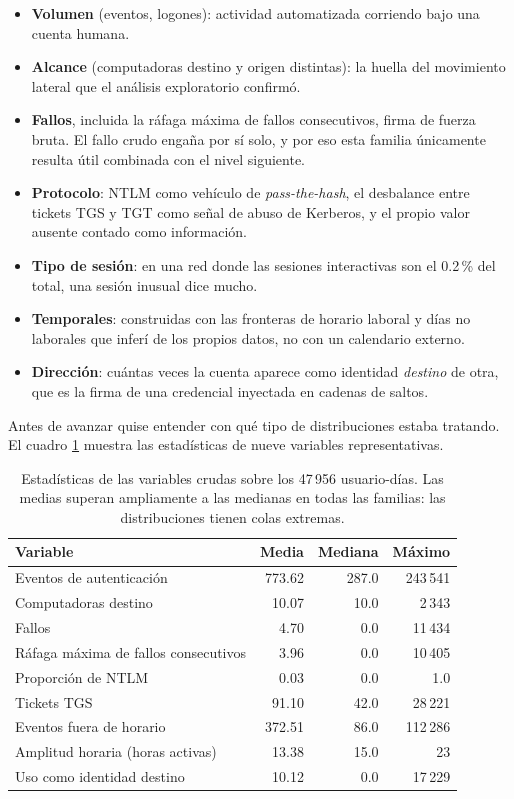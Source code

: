 \documentclass[12pt, a4paper]{article}
\begin{document}
\begin{itemize}[leftmargin=1.2cm, itemsep=2pt]
  \item \textbf{Volumen} (eventos, logones): actividad automatizada corriendo bajo una cuenta humana.
  \item \textbf{Alcance} (computadoras destino y origen distintas): la huella del movimiento lateral
        que el análisis exploratorio confirmó.
  \item \textbf{Fallos}, incluida la ráfaga máxima de fallos consecutivos, firma de fuerza bruta. El
        fallo crudo engaña por sí solo, y por eso esta familia únicamente resulta útil combinada con
        el nivel siguiente.
  \item \textbf{Protocolo}: NTLM como vehículo de \textit{pass-the-hash}, el desbalance entre tickets
        TGS y TGT como señal de abuso de Kerberos, y el propio valor ausente contado como información.
  \item \textbf{Tipo de sesión}: en una red donde las sesiones interactivas son el 0.2\,\% del total,
        una sesión inusual dice mucho.
  \item \textbf{Temporales}: construidas con las fronteras de horario laboral y días no laborales que
        inferí de los propios datos, no con un calendario externo.
  \item \textbf{Dirección}: cuántas veces la cuenta aparece como identidad \textit{destino} de otra,
        que es la firma de una credencial inyectada en cadenas de saltos.
\end{itemize}

Antes de avanzar quise entender con qué tipo de distribuciones estaba tratando. El cuadro
\ref{tab:crudas} muestra las estadísticas de nueve variables representativas.

\begin{table}[!htb]
\centering
\small
\setlength{\tabcolsep}{8pt}
\begin{tabular}{lrrr}
\toprule
\textbf{Variable} & \textbf{Media} & \textbf{Mediana} & \textbf{Máximo} \\
\midrule
Eventos de autenticación & 773.62 & 287.0 & 243\,541 \\
Computadoras destino & 10.07 & 10.0 & 2\,343 \\
Fallos & 4.70 & 0.0 & 11\,434 \\
Ráfaga máxima de fallos consecutivos & 3.96 & 0.0 & 10\,405 \\
Proporción de NTLM & 0.03 & 0.0 & 1.0 \\
Tickets TGS & 91.10 & 42.0 & 28\,221 \\
Eventos fuera de horario & 372.51 & 86.0 & 112\,286 \\
Amplitud horaria (horas activas) & 13.38 & 15.0 & 23 \\
Uso como identidad destino & 10.12 & 0.0 & 17\,229 \\
\bottomrule
\end{tabular}
\caption{Estadísticas de las variables crudas sobre los 47\,956 usuario-días. Las medias superan
ampliamente a las medianas en todas las familias: las distribuciones tienen colas extremas.}
\label{tab:crudas}
\end{table}
\end{document}
